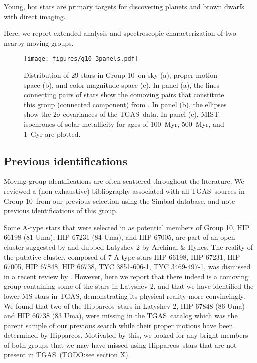 \documentclass[modern,letterpaper]{aastex61}
\newcommand{\acronym}[1]{{\small{#1}}}
\newcommand{\hipparcos}{Hipparcos}
\newcommand{\tgas}{\acronym{TGAS}}
\newcommand{\groupTen}{Group 10}
\newcommand{\todo}[1]{{\color{crimson}TODO:#1}}
\begin{document}
Young, hot stars are primary targets for discovering planets and brown dwarfs
with direct imaging.

Here, we report extended analysis and spectroscopic characterization of two
nearby moving groups.


\begin{figure}[ht]
  \centering
  \texttt{[image: figures/g10\_3panels.pdf]}
  \caption{\label{fig:g10_3panels}
    Distribution of 29 stars in \groupTen\ on sky (a),
    proper-motion space (b), and color-magnitude space (c).
    In panel (a), the lines connecting pairs of stars show the comoving pairs
    that constitute this group (connected component) from
    \citet{2017AJ....153..257O}.
    In panel (b), the ellipses show the $2\sigma$ covariances of the \tgas\
    data.
    In panel (c), MIST isochrones of solar-metallicity for ages of 100~Myr,
    500~Myr, and 1~Gyr are plotted.
  }
\end{figure}


\subsection{Previous identifications}
\label{subsec:history}

Moving group identifications are often scattered throughout the literature. We
reviewed a (non-exhaustive) bibliography associated with all \tgas\ sources in
\groupTen\ from our previous selection \citep{2017AJ....153..257O} using the
Simbad database, and note previous identifications of this group.

Some A-type stars that were selected in \citet{2017AJ....153..257O} as potential
members of \groupTen,
HIP 66198 (81 Uma), HIP 67231 (84 Uma), and HIP 67005, are part of an open cluster
suggested by \citet{1977ATsir.969....7L} and dubbed Latyshev 2 by Archinal \& Hynes.
The reality of the putative cluster, composed of 7 A-type stars
HIP 66198,
HIP 67231,
HIP 67005,
HIP 67848,
HIP 66738,
TYC 3851-606-1,
TYC 3469-497-1,
was dismissed in a recent review by \citet{2016IAUS..314...21M}.
However, here we report that there indeed is a comoving group containing
some of the stars in Latyshev 2, and that we have identified the lower-MS stars
in \tgas, demonstrating its physical reality more convincingly.
We found that two of the \hipparcos\ stars in Latyshev 2,
HIP 67848 (86 Uma) and HIP 66738 (83 Uma),
were missing in the \tgas\ catalog which was the parent sample of our previous search while
their proper motions have been determined by \hipparcos.
Motivated by this, we looked for any bright members of both groups that we
may have missed using \hipparcos\ stars that are not present in \tgas\ (\todo{see section X}).
\end{document}
